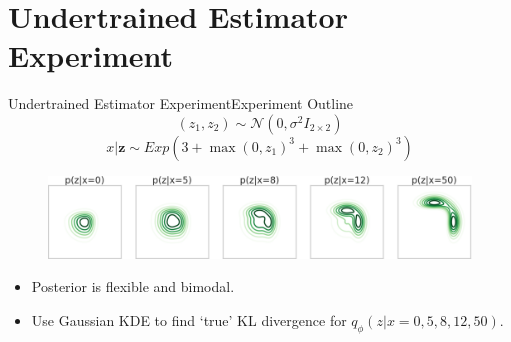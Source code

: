 \documentclass[handout]{beamer}
\begin{document}
\section{Undertrained Estimator Experiment}
\begin{frame}{Undertrained Estimator Experiment}{Experiment Outline}
\[(z_1,z_2)\sim \mathcal{N} (0,\sigma^2 I_{2\times 2})\]
\[x|\bm{z}\sim Exp(3+\max(0,z_1)^3+\max(0,z_2)^3)\]
\begin{figure}[h]
\includegraphics[width=\textwidth]{sprinklertrue.png}
\end{figure}
\begin{itemize}
\item Posterior is flexible and bimodal.
\item Use Gaussian KDE to find `true' KL divergence for $q_\phi(z|x=0,5,8,12,50)$.
\end{itemize}
\end{frame}
\end{document}
